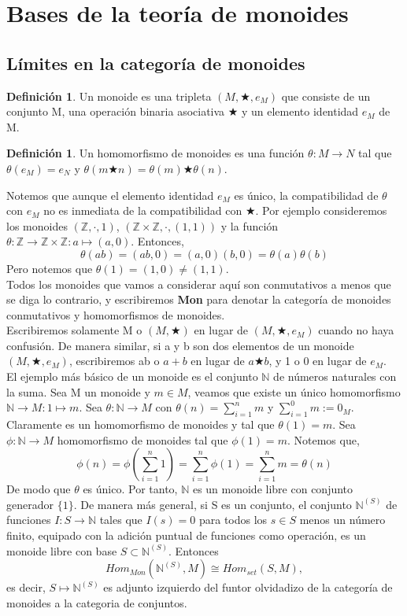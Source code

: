 \documentclass[12pt,spanish]{amsart}
\newcommand{\bb}[1]{\mathbb{#1}}
\newcommand{\N}{\bb N}
\theoremstyle{definition}
\newtheorem{Def}[Theorem]{Definición}
\theoremstyle{remark}
\begin{document}
\section{Bases de la teoría de monoides}

\subsection{Límites en la categoría de monoides}
 \begin{Def}
Un monoide es una tripleta $(M,\bigstar,e_{M})$ que consiste de un conjunto M, una operación binaria asociativa $\bigstar$ y un elemento identidad $e_{M}$ de M.
 \end{Def}
 
\begin{Def}
Un homomorfismo de monoides es una función $\theta: M \to N$ tal que $\theta(e_{M})=e_{N}$ y $\theta(m\bigstar n)= \theta(m)\bigstar \theta(n)$.
\end{Def}

Notemos que aunque el elemento identidad $e_{M}$ es único, la compatibilidad de $\theta$ con $e_{M}$ no es inmediata de la compatibilidad con $\bigstar$. Por ejemplo consideremos los monoides $(\mathbb{Z},\cdot,1)$, $(\mathbb{Z} \times \mathbb{Z},\cdot,(1,1))$ y la función $\theta:\mathbb{Z}\to \mathbb{Z} \times \mathbb{Z}:a \mapsto (a,0)$. Entonces, 
$$\theta(ab) = (ab,0) = (a,0)(b,0) =  \theta(a)\theta(b)$$
Pero notemos que $\theta(1)=(1,0) \neq (1,1)$.\\
Todos los monoides que vamos a considerar aquí son conmutativos a menos que se diga lo contrario, y escribiremos \textbf{Mon} para denotar la categoría de monoides conmutativos y homomorfismos de monoides. \\
Escribiremos solamente M o $(M,\bigstar)$ en lugar de $(M,\bigstar,e_{M})$ cuando no haya confusión. De manera similar, si a y b son dos elementos de un monoide $(M,\bigstar,e_{M})$, escribiremos ab o $a+b$ en lugar de $a\bigstar b$, y 1 o 0 en lugar de $e_{M}$. \\
El ejemplo más básico de un monoide es el conjunto $\bb{N}$ de números naturales con la suma. Sea M un monoide y $m\in M$, veamos que existe un único homomorfismo $\bb{N} \to M:1 \mapsto m$. Sea $\theta:\bb{N}\to M$ con $\theta(n)=\sum_{i=1}^{n}m$ y $\sum_{i=1}^{0}m := 0_{M}$. Claramente es un homomorfismo de monoides y tal que $\theta(1)=m$. Sea $\phi:\bb{N} \to M$ homomorfismo de monoides tal que $\phi(1)=m$. Notemos que,
$$\phi(n) = \phi(\sum_{i=1}^{n}1) = \sum_{i=1}^{n}\phi(1) = \sum_{i=1}^{n}m = \theta(n)$$
De modo que $\theta$ es único. Por tanto, $\bb{N}$ es un monoide libre con conjunto generador $\{1\}$. De manera más general, si S es un conjunto, el conjunto $\bb{N}^{(S)}$ de funciones $I:S \to \bb{N}$ tales que $I(s)=0$ para todos los $s\in S$ menos un número finito, equipado con la adición puntual de funciones como operación, es un monoide libre con base $S \subset \N^{(S)}$. Entonces
$$Hom_{Mon}(\bb{N}^{(S)},M) \cong Hom_{set}(S,M),$$
es decir, $S \mapsto \bb{N}^{(S)}$ es adjunto izquierdo del funtor olvidadizo de la categoría de monoides a la categoria de conjuntos. \\
\end{document}

